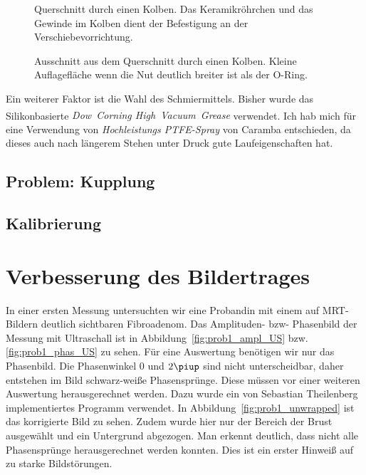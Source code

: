\documentclass[
    11pt,
    ngerman
]{scrreprt}
\begin{document}
\begin{figure}[htbp]
    \centering
    
    \caption{%
        Querschnitt durch einen Kolben. Das Keramikröhrchen und das Gewinde im Kolben dient der Befestigung an der Verschiebevorrichtung.
    }
    \label{fig:kolben}
\end{figure}


\begin{figure}[htbp]
\begin{minipage}[htbp]{.45\textwidth}
    \centering
    
    \caption{%
        Ausschnitt aus dem Querschnitt durch einen Kolben. Breite Auflagefläche des O-Rings bei zu schmaler Nut.
    }
    \label{fig:nut_schmal}
\end{minipage}
\hfill
\begin{minipage}[htbp]{.45\textwidth}
    \centering
    
    \caption{%
        Ausschnitt aus dem Querschnitt durch einen Kolben. Kleine Auflagefläche wenn die Nut deutlich breiter ist als der O-Ring.
    }
    \label{fig:nut_breit}
\end{minipage}
\end{figure}

Ein weiterer Faktor ist die Wahl des Schmiermittels. Bisher wurde das
Silikonbasierte \linebreak \emph{Dow~Corning\textsuperscript{\textregistered}
High~Vacuum~Grease} verwendet. Ich hab mich für eine Verwendung von \linebreak
\emph{Hochleistungs PTFE-Spray} von Caramba entschieden, da dieses
auch nach längerem Stehen unter Druck gute Laufeigenschaften hat.


\subsection{Problem: Kupplung}

\subsection{Kalibrierung}

\section{Verbesserung des Bildertrages}

In einer ersten Messung untersuchten wir eine Probandin mit einem auf
MRT-Bildern deutlich sichtbaren Fibroadenom. Das Amplituden- bzw- Phasenbild
der Messung mit Ultraschall ist in Abbildung~\ref{fig:prob1_ampl_US} bzw.
\ref{fig:prob1_phas_US} zu sehen.  Für eine Auswertung benötigen wir nur das
Phasenbild. Die Phasenwinkel 0 und $2\piup$ sind nicht unterscheidbar, daher
entstehen im Bild schwarz-weiße Phasensprünge. Diese müssen vor einer weiteren
Auswertung herausgerechnet werden. Dazu wurde ein von Sebastian Theilenberg
implementiertes Programm verwendet. In Abbildung~\ref{fig:prob1_unwrapped} ist
das korrigierte Bild zu sehen. Zudem wurde hier nur der Bereich der Brust
ausgewählt und ein Untergrund abgezogen. Man erkennt deutlich, dass nicht alle
Phasensprünge herausgerechnet werden konnten. Dies ist ein erster Hinweiß auf
zu starke Bildstörungen.
\end{document}
